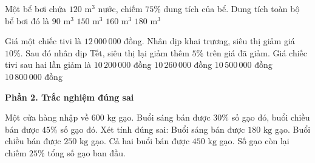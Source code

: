 \begin{ex} %
Một bể bơi chứa $120\text{ m}^3$ nước, chiếm $75\%$ dung tích của bể. Dung tích toàn bộ bể bơi đó là
\choice
{$90\text{ m}^3$}
{$150\text{ m}^3$}
{\True $160\text{ m}^3$}
{$180\text{ m}^3$}
\end{ex}

\begin{ex} %
Giá một chiếc tivi là $12\,000\,000$ đồng. Nhân dịp khai trương, siêu thị giảm giá $10\%$. Sau đó nhân dịp Tết, siêu thị lại giảm thêm $5\%$ trên giá đã giảm. Giá chiếc tivi sau hai lần giảm là
\choice
{$10\,200\,000$ đồng}
{\True $10\,260\,000$ đồng}
{$10\,500\,000$ đồng}
{$10\,800\,000$ đồng}
\end{ex}

\textbf{Phần 2. Trắc nghiệm đúng sai}

\begin{ex} %
Một cửa hàng nhập về $600\text{ kg}$ gạo. Buổi sáng bán được $30\%$ số gạo đó, buổi chiều bán được $45\%$ số gạo đó. Xét tính đúng sai:
\choiceTF
{\True Buổi sáng bán được $180\text{ kg}$ gạo.}
{Buổi chiều bán được $250\text{ kg}$ gạo.}
{\True Cả hai buổi bán được $450\text{ kg}$ gạo.}
{\True Số gạo còn lại chiếm $25\%$ tổng số gạo ban đầu.}
\end{ex}

